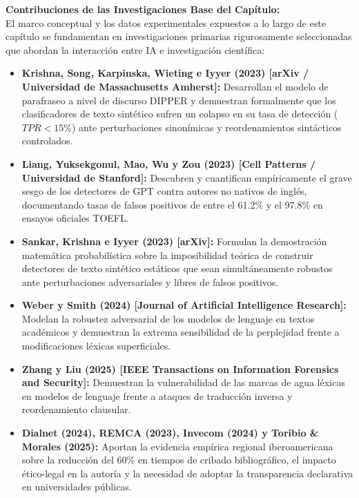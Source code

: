 \textbf{Contribuciones de las Investigaciones Base del Capítulo:}\\[0.2cm]
El marco conceptual y los datos experimentales expuestos a lo largo de este capítulo se fundamentan en investigaciones primarias rigurosamente seleccionadas que abordan la interacción entre IA e investigación científica:
\begin{itemize}
    \item \textbf{Krishna, Song, Karpinska, Wieting e Iyyer (2023) [arXiv / Universidad de Massachusetts Amherst]:} Desarrollan el modelo de parafraseo a nivel de discurso DIPPER y demuestran formalmente que los clasificadores de texto sintético sufren un colapso en su tasa de detección ($TPR < 15\%$) ante perturbaciones sinonímicas y reordenamientos sintácticos controlados.
    \item \textbf{Liang, Yuksekgonul, Mao, Wu y Zou (2023) [Cell Patterns / Universidad de Stanford]:} Descubren y cuantifican empíricamente el grave sesgo de los detectores de GPT contra autores no nativos de inglés, documentando tasas de falsos positivos de entre el 61.2\% y el 97.8\% en ensayos oficiales TOEFL.
    \item \textbf{Sankar, Krishna e Iyyer (2023) [arXiv]:} Formulan la demostración matemática probabilística sobre la imposibilidad teórica de construir detectores de texto sintético estáticos que sean simultáneamente robustos ante perturbaciones adversariales y libres de falsos positivos.
    \item \textbf{Weber y Smith (2024) [Journal of Artificial Intelligence Research]:} Modelan la robustez adversarial de los modelos de lenguaje en textos académicos y demuestran la extrema sensibilidad de la perplejidad frente a modificaciones léxicas superficiales.
    \item \textbf{Zhang y Liu (2025) [IEEE Transactions on Information Forensics and Security]:} Demuestran la vulnerabilidad de las marcas de agua léxicas en modelos de lenguaje frente a ataques de traducción inversa y reordenamiento clausular.
    \item \textbf{Dialnet (2024), REMCA (2023), Invecom (2024) y Toribio \& Morales (2025):} Aportan la evidencia empírica regional iberoamericana sobre la reducción del 60\% en tiempos de cribado bibliográfico, el impacto ético-legal en la autoría y la necesidad de adoptar la transparencia declarativa en universidades públicas.
\end{itemize}

\vspace{0.3cm}
